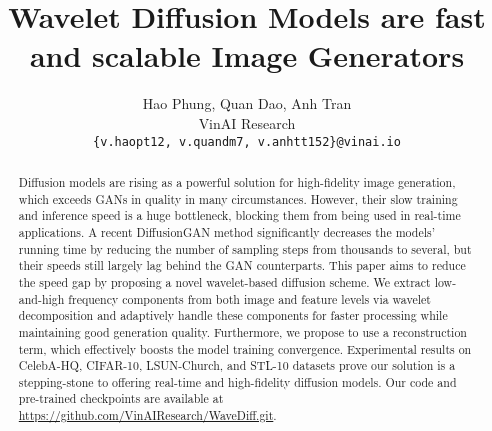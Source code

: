 \documentclass[10pt,twocolumn,letterpaper]{article}
\begin{document}
\title{Wavelet Diffusion Models are fast and scalable Image Generators}

\author{
Hao Phung, Quan Dao, Anh Tran\\
VinAI Research\\
{\tt\small \{v.haopt12, v.quandm7, v.anhtt152\}@vinai.io}
}

\maketitle

\begin{abstract}
Diffusion models are rising as a powerful solution for high-fidelity image generation, which exceeds GANs in quality in many circumstances. However, their slow training and inference speed is a huge bottleneck, blocking them from being used in real-time applications. A recent DiffusionGAN method significantly decreases the models' running time by reducing the number of sampling steps from thousands to several, but their speeds still largely lag behind the GAN counterparts. This paper aims to reduce the speed gap by proposing a novel wavelet-based diffusion scheme. We extract low-and-high frequency components from both image and feature levels via wavelet decomposition and adaptively handle these components for faster processing while maintaining good generation quality. Furthermore, we propose to use a reconstruction term, which effectively boosts the model training convergence. Experimental results on CelebA-HQ, CIFAR-10, LSUN-Church, and STL-10 datasets prove our solution is a stepping-stone to offering real-time and high-fidelity diffusion models. Our code and pre-trained checkpoints are available at \url{https://github.com/VinAIResearch/WaveDiff.git}.
\end{abstract}
\end{document}

